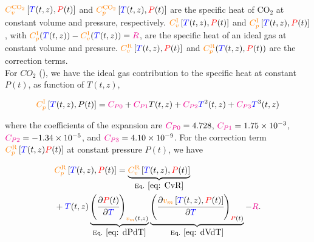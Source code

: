 \documentclass[../Article_Model_Parameters.tex]{subfiles}
\begin{document}
	${\color{orange}C^{\text{CO}_2}_v}\left[{\color{blue}T}(t,z), {\color{red}P}(t)\right]$ and ${\color{orange}C^{\text{CO}_2}_p}\left[{\color{blue}T}(t,z), {\color{red}P}(t)\right]$ are the specific heat of $\text{CO}_2$ at constant volume and pressure, respectively. ${\color{orange}C_v^{\text{I}}}\left[{\color{blue}T}(t,z), {\color{red}P}(t)\right]$ and ${\color{orange}C_p^{\text{I}}}\left[{\color{blue}T}(t,z), {\color{red}P}(t)\right]$, with ${\color{orange}C_p^{\text{I}}}({\color{blue}T}(t,z)) - {\color{orange}C_v^{\text{I}}}({\color{blue}T}(t,z)) = {\color{magenta}R}$, are the specific heat of an ideal gas at constant volume and pressure. ${\color{orange}C_v^{\text{R}}}\left[{\color{blue}T}(t,z), {\color{red}P}(t)\right]$ and ${\color{orange}C_p^{\text{R}}}({\color{blue}T}(t,z), {\color{red}P}(t))$ are the correction terms. \\
	
	For $CO_2$ (), we have the ideal gas contribution to the specific heat at constant $P(t)$, as function of $T(t,z)$,
	
	{\footnotesize
	\begin{equation}
		{\color{orange}C_p^{\text{I}}}\left[{\color{blue}T}(t,z),P(t)\right] = {\color{magenta}C_{P0}} + {\color{magenta}C_{P1}}T(t,z) + {\color{magenta}C_{P2}}{\color{blue}T}^2(t,z) + {\color{magenta}C_{P3}}{\color{blue}T}^3(t,z) \label{eq: Cp_I}
	\end{equation} }

	where the coefficients of the expansion are ${\color{magenta}C_{P0}} = 4.728$, ${\color{magenta}C_{P1}} = 1.75 \times 10^{-3}$, ${\color{magenta}C_{P2}} = -1.34 \times 10^{-5}$, and ${\color{magenta}C_{P3}} = 4.10 \times 10^{-9}$. For the correction term ${\color{orange}C_p^{\text{R}}}\left[{\color{blue}T}(t,z){\color{red}P}(t)\right]$ at constant pressure $P(t)$, we have
	
	{\footnotesize	
	\begin{align}
		&{\color{orange}C_p^{\text{R}}}\left[{\color{blue}T}(t,z), {\color{red}P}(t)\right] = \underbrace{{\color{orange}C_v^{\text{R}}}\left[{\color{blue}T}(t,z), {\color{red}P}(t)\right]}_{\text{Eq. }\eqref{eq: CvR}} \nonumber \\
		&+ {\color{blue}T}(t,z) \underbrace{\left(\cfrac{\partial {\color{red}P}(t)}{\partial {\color{blue}T}}\right)_{{\color{orange}v_m}(t,z)}}_{\text{Eq. } \eqref{eq: dPdT}} \underbrace{\left(\cfrac{\partial {\color{orange}v_m}\left[{\color{blue}T}(t,z),{\color{red}P}(t)\right]}{\partial {\color{blue}T}}\right)_{{\color{red}P}(t)}}_{\text{Eq. } \eqref{eq: dVdT}} - {\color{magenta}R}. \label{eq: Cp_R} 
	\end{align} }
\end{document}
